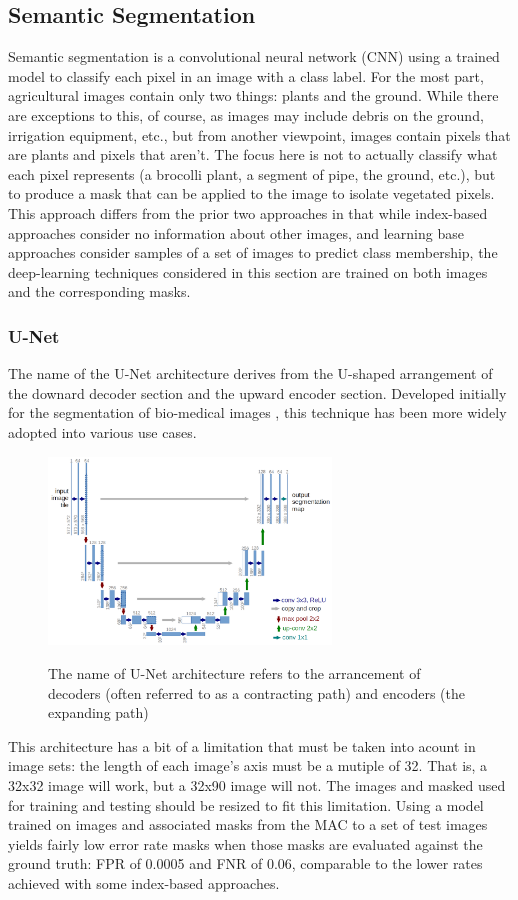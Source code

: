 \documentclass[letterpaper]{article}
\begin{document}
{{%
%

\subsection{Semantic Segmentation}
Semantic segmentation is a convolutional neural network (CNN) using a trained model to classify each pixel in an image with a class label.  For the most part, agricultural images contain only two things: plants and the ground. While there are exceptions to this, of course, as images may include debris on the ground, irrigation equipment, etc., but from another viewpoint, images contain pixels that are plants and pixels that aren't.  The focus here is not to actually classify what each pixel represents (a brocolli plant, a segment of pipe, the ground, etc.), but to produce a mask that can be applied to the image to isolate vegetated pixels. This approach differs from the prior two approaches in that while index-based approaches consider no information about other images, and learning base approaches consider samples of a set of images to predict class membership, the deep-learning techniques considered in this section are trained on both images and the corresponding masks.

\subsubsection{U-Net}
The name of the U-Net architecture derives from the U-shaped arrangement of the downard decoder section and the upward encoder section. Developed initially for the segmentation of bio-medical images \cite{Ronneberger2015-ye}, this technique has been more widely adopted into various use cases.

\begin{figure}[H]
	\centering
	\includegraphics[height=5cm]{figures/u-net-architecture.png}
	\label{fig:u-net}
	\caption[U-Net architecture]{The name of U-Net architecture refers to the arrancement of decoders (often referred to as a contracting path) and encoders (the expanding path)}
\end{figure}
This architecture has a bit of a limitation that must be taken into acount in image sets: the length of each image's axis must be a mutiple of 32. That is, a 32x32 image will work, but a 32x90 image will not. The images and masked used for training and testing should be resized to fit this limitation. Using a model trained on images and associated masks from the MAC to a set of test images yields fairly low error rate masks when  those masks are evaluated against the ground truth: FPR of 0.0005 and FNR of 0.06, comparable to the lower rates achieved with some index-based approaches.

}}
\end{document}
